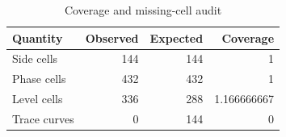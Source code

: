 \begin{table}[htbp]
\centering
\caption{Coverage and missing-cell audit}
\small
\begin{tabular}{@{}lrrr@{}}
\toprule
Quantity & Observed & Expected & Coverage \\
\midrule
Side cells & 144 & 144 & 1 \\
Phase cells & 432 & 432 & 1 \\
Level cells & 336 & 288 & 1.166666667 \\
Trace curves & 0 & 144 & 0 \\
\bottomrule
\end{tabular}
\end{table}
